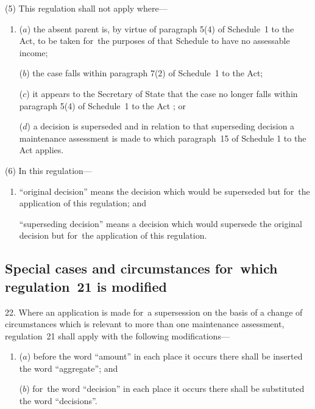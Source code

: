 \documentclass[a4paper,12pt]{article}
\begin{document}
(5) This regulation shall not apply where---
\begin{enumerate}\item[]
($a$) the absent parent is, by virtue of paragraph 5(4) of Schedule~1 to the Act, to be taken for~the purposes of that Schedule to have no assessable income;

($b$) the case falls within paragraph 7(2) of Schedule~1 to the Act; 

($c$) it appears to the Secretary of State that the case no longer falls within paragraph 5(4) of Schedule~1 to the Act%
%
; or

($d$) a decision is superseded and in relation to that superseding decision a maintenance assessment is made to which paragraph~15 of Schedule 1 to the Act applies.
\end{enumerate}

(6) In this regulation---
\begin{enumerate}\item[]
“original decision” means the decision which would be superseded but for~the application of this regulation; and

“superseding decision” means a decision which would supersede the original decision but for~the application of this regulation.
\end{enumerate}


\subsection[22. Special cases and circumstances for~which regulation~21 is modified]{Special cases and circumstances for~which regulation~21 is modified}

22.  Where an application is made for~a supersession on the basis of a change of circumstances which is relevant to more than one maintenance assessment, regulation~21 shall apply with the following modifications---
\begin{enumerate}\item[]
($a$) before the word “amount” in each place it occurs there shall be inserted the word “aggregate”; and

($b$) for~the word “decision” in each place it occurs there shall be substituted the word “decisions”.
\end{enumerate}
\end{document}
